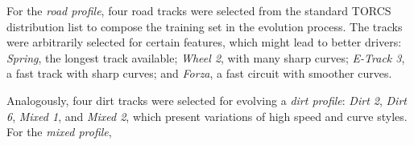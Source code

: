 




For the \emph{road profile}, four road tracks were selected from the standard TORCS distribution list to compose the training set in the evolution process. The tracks were arbitrarily selected for certain features, which might lead to better drivers: \emph{Spring}, the longest track available; \emph{Wheel 2}, with many sharp curves; \emph{E-Track 3}, a fast track with sharp curves; and \emph{Forza}, a fast circuit with smoother curves.

Analogously, four dirt tracks were selected for evolving a \emph{dirt profile}: \emph{Dirt 2}, \emph{Dirt 6}, \emph{Mixed 1}, and \emph{Mixed 2}, which present variations of high speed and curve styles. For the \emph{mixed profile}, 

